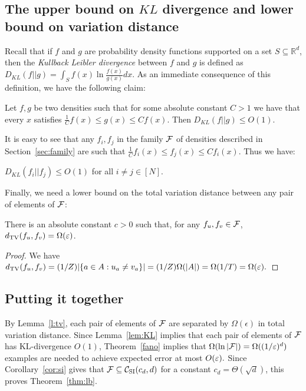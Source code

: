 \subsection{The upper bound on $KL$ divergence and lower bound on variation distance}

Recall that if $f$ and $g$ are probability density functions supported on a set $S \subseteq \mathbb{R}^d$, then the \emph{Kullback Leibler divergence} between $f$ and $g$ is defined as
$
D_{KL}(f || g) = \int_S f(x) \ln {\frac {f(x)}{g(x)}} dx.
$
As an immediate consequence of this definition, we have the following claim:

\begin{claim} Let $f,g$ be two densities such that for some absolute constant $C > 1$ we have that every $x$  satisfies ${\frac 1 C} f(x) \leq g(x) \leq C f(x).$  Then $D_{KL}(f || g) \leq O(1).$
\end{claim}

It is easy to see that any $f_i,f_j$ in the family ${\cal F}$ of densities described in Section~\ref{sec:family} are such that 
${\frac 1 C} f_i(x) \leq f_j(x) \leq C f_i(x).$  Thus we have:

\begin{lemma} \label{lem:KL}
$D_{KL}(f_i || f_j) \leq O(1)$ for all $i \neq j \in [N]$.
\end{lemma}

Finally, we need a lower bound on the total variation distance between any pair of elements of ${\cal F}$:
\begin{lemma}
\label{l:tv}
There is an absolute constant $c>0$ such that,
for any $f_u, f_v \in {\cal F}$, $d_\mathrm{TV}(f_u, f_v) = \Omega(\varepsilon)$.
\end{lemma}
\begin{proof}
We have $
d_\mathrm{TV} (f_u, f_v) = (1/Z) |\{ a \in A : u_a \neq v_a \}| = (1/Z) \Omega(|A|) = \Omega(1/T) = \Omega(\varepsilon).
$
\end{proof}

\subsection{Putting it together}

By Lemma~\ref{l:tv}, each pair of elements of ${\cal F}$ are separated by $\Omega(\epsilon)$ in
total variation distance.  Since Lemma~\ref{lem:KL} implies that each pair of elements of ${\cal F}$ has KL-divergence $O(1)$, Theorem~\ref{fano} implies that $\Omega(\ln |{\cal F}|) = \Omega((1/\varepsilon)^d)$ examples are needed to achieve expected error at most $O(\varepsilon).$  Since Corollary~\ref{cor:si} gives that ${\cal F} \subseteq {\cal C}_{\mathrm{SI}}(c_d,d)$ for a constant $c_d=\Theta(\sqrt{d})$, this proves
Theorem~\ref{thm:lb}.



